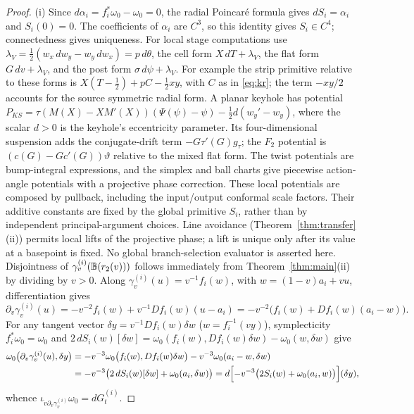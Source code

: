 \begin{proof}
(i) Since $d\alpha_i=f_i^*\omega_0-\omega_0=0$, the radial Poincar\'e formula gives $dS_i=\alpha_i$ and $S_i(0)=0$.
The coefficients of $\alpha_i$ are $C^3$, so this identity gives $S_i\in C^4$; connectedness gives uniqueness.
For local stage computations use $\lambda_V=\frac12(w_x\,dw_y-w_y\,dw_x)=p\,d\theta$, the cell form
$X\,dT+\lambda_V$, the flat form $G\,dv+\lambda_V$, and the post form $\sigma\,d\psi+\lambda_V$.
For example the strip primitive relative to these forms is
$X(T-\frac12)+pC-\frac12xy$, with $C$ as in \eqref{eq:kr}; the term $-xy/2$ accounts for the source
symmetric radial form. A planar keyhole has potential
$P_{KS}=\tau(M(X)-XM'(X))(\Psi(\psi)-\psi)-\frac12d(w_y'-w_y)$,
where the scalar $d>0$ is the keyhole's eccentricity parameter.
Its four-dimensional suspension adds the conjugate-drift term $-G\tau'(G)g_\tau$; the $F_2$ potential is
$(c(G)-Gc'(G))\vartheta$ relative to the mixed flat form. The twist potentials are bump-integral expressions,
and the simplex and ball charts give piecewise action-angle potentials with a projective phase correction.
These local potentials are composed by pullback, including the input/output conformal scale factors. Their additive
constants are fixed by the global primitive $S_i$, rather than by independent principal-argument choices.
Line avoidance (Theorem~\ref{thm:transfer}(ii)) permits local lifts of the projective phase; a lift is unique only after
its value at a basepoint is fixed. No global branch-selection evaluator is asserted here. Disjointness
of $\gamma_v^{(i)}(\mathbb{B}(r_2(v)))$ follows immediately from Theorem~\ref{thm:main}(ii) by dividing by $v>0$.
Along $\gamma_v^{(i)}(u)=v^{-1}f_i(w)$, with $w=(1-v)a_i+vu$, differentiation gives
\[
 \partial_v\gamma_v^{(i)}(u)
 = -v^{-2}f_i(w) + v^{-1}Df_i(w)(u-a_i)
 = -v^{-2}\bigl(f_i(w)+Df_i(w)(a_i-w)\bigr).
\]
For any tangent vector $\delta y=v^{-1}Df_i(w)\delta w$ ($w=f_i^{-1}(vy)$), symplecticity $f_i^*\omega_0=\omega_0$ and
$2\,dS_i(w)[\delta w]=\omega_0(f_i(w),Df_i(w)\delta w)-\omega_0(w,\delta w)$ give
\begin{align*}
 \omega_0\bigl(\partial_v\gamma_v^{(i)}(u),\delta y\bigr)
 &= -v^{-3}\omega_0\bigl(f_i(w),Df_i(w)\delta w\bigr) - v^{-3}\omega_0(a_i-w,\delta w)\\
 &= -v^{-3}\bigl(2\,dS_i(w)[\delta w]+\omega_0(a_i,\delta w)\bigr)
  = d\Bigl[-v^{-3}\bigl(2S_i(w)+\omega_0(a_i,w)\bigr)\Bigr](\delta y),
\end{align*}
whence $\iota_{\dot v\partial_v\gamma_v^{(i)}}\omega_0=dG_t^{(i)}$.


\end{proof}
